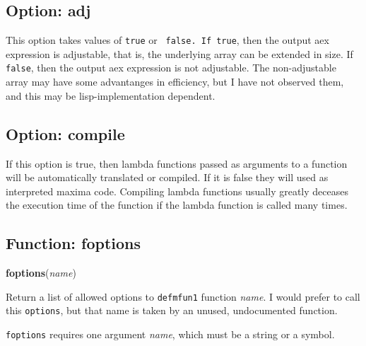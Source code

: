\documentclass[]{article}
\begin{document}
\subsection{Option: adj\label{sec:adj}}
\hypertarget{adj}{}



\vspace{5 pt}
This option takes values of \verb#true# or \verb# false. If #\verb#true#, then the output aex expression is adjustable, that is, the underlying array can be extended in size. If \verb#false#, then the output aex expression is not adjustable. The non-adjustable array may have some advantanges in 
efficiency, but I have not observed them, and this may be lisp-implementation dependent. 

\vspace{5 pt}


\subsection{Option: compile\label{sec:compile}}
\hypertarget{compile}{}



\vspace{5 pt}
If this option is true, then lambda functions passed as arguments to a function will be automatically translated or compiled. If it is false they will used as interpreted maxima code. Compiling lambda functions usually greatly deceases the execution time of the function if the lambda function is 
called many times. 

\vspace{5 pt}


\subsection{Function: foptions\label{sec:foptions}}
\hypertarget{foptions}{}
{\bf foptions}({\it name})



\vspace{5 pt}
Return a list of allowed options to \verb#defmfun1# function {\it name}. I would prefer to call this \verb#options#, but that name is taken by an unused, undocumented function. 

\vspace{5 pt}

   {\tt foptions} requires one argument {\it name}, which must be a string or a symbol.
\end{document}
